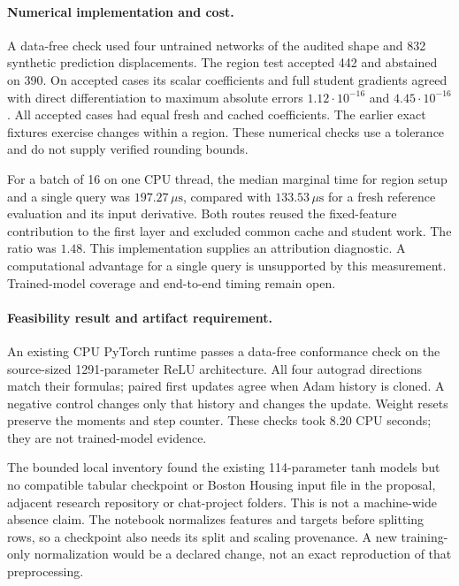 \documentclass[11pt,a4paper]{article}
\begin{document}
\paragraph{Numerical implementation and cost.}
A data-free check used four untrained networks of the audited shape and
832 synthetic prediction displacements. The region test accepted 442
and abstained on 390. On accepted cases its scalar coefficients and
full student gradients agreed with direct differentiation to maximum
absolute errors $1.12\cdot10^{-16}$ and $4.45\cdot10^{-16}$.
All accepted cases had equal fresh and cached coefficients. The earlier
exact fixtures exercise changes within a region. These numerical
checks use a tolerance and do not supply verified rounding bounds.

For a batch of 16 on one CPU thread, the median marginal time for region
setup and a single query was $197.27\,\mu\mathrm{s}$, compared with
$133.53\,\mu\mathrm{s}$ for a fresh reference evaluation and its input
derivative. Both routes reused the fixed-feature contribution to the
first layer and excluded common cache and student work. The ratio was
$1.48$. This implementation supplies an attribution diagnostic.
A computational advantage for a single query is unsupported by this
measurement. Trained-model coverage and end-to-end timing remain open.

\paragraph{Feasibility result and artifact requirement.}
An existing CPU PyTorch runtime passes a data-free conformance check on
the source-sized 1291-parameter ReLU architecture. All four autograd
directions match their formulas; paired first updates agree when Adam
history is cloned. A negative control changes only that history and
changes the update. Weight resets preserve the moments and step counter.
These checks took 8.20 CPU seconds; they are not trained-model evidence.

The bounded local inventory found the existing 114-parameter tanh models
but no compatible tabular checkpoint or Boston Housing input file in the
proposal, adjacent research repository or chat-project folders. This is
not a machine-wide absence claim. The notebook normalizes features and
targets before splitting rows, so a checkpoint also needs its split and
scaling provenance. A new training-only normalization would be a declared
change, not an exact reproduction of that preprocessing.
\end{document}
